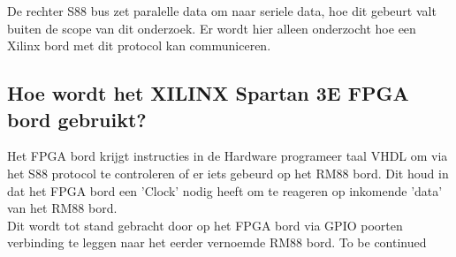 De rechter S88 bus zet paralelle data om naar seriele data, hoe dit gebeurt valt buiten de scope van dit onderzoek. Er wordt hier alleen onderzocht hoe een Xilinx bord met dit protocol kan communiceren.
\clearpage
	
\subsection{Hoe wordt het XILINX Spartan 3E FPGA bord gebruikt?}
Het FPGA bord krijgt instructies in de Hardware programeer taal VHDL om via het S88 protocol te controleren of er iets gebeurd op het RM88 bord. Dit houd in dat het FPGA bord een 'Clock' nodig heeft om te reageren op inkomende 'data' van het RM88 bord.\\
Dit wordt tot stand gebracht door op het FPGA bord via GPIO poorten verbinding te leggen naar het eerder vernoemde RM88 bord. To be continued